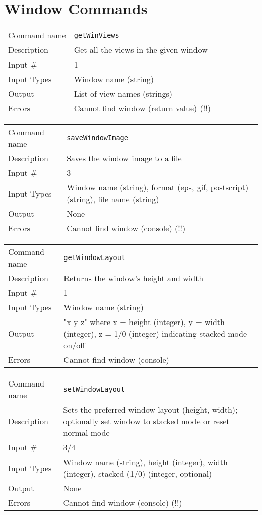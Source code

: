 \section{Window Commands}

\noindent
\begin{tabular}{l|p{5in}}
\hline
Command name & {\tt getWinViews} \\
Description  & Get all the views in the given window \\
Input \#     & 1 \\
Input Types  & Window name (string) \\
Output       & List of view names (strings) \\
Errors       & Cannot find window (return value) (!!) \\
\hline
\end{tabular}

\bigskip

\noindent
\begin{tabular}{l|p{5in}}
\hline
Command name & {\tt saveWindowImage} \\
Description  & Saves the window image to a file \\
Input \#     & 3 \\
Input Types  & Window name (string), format (eps, gif, postscript) (string),
               file name (string) \\
Output       & None \\
Errors       & Cannot find window (console) (!!) \\
\hline
\end{tabular}

\bigskip

\noindent
\begin{tabular}{l|p{5in}}
\hline
Command name & {\tt getWindowLayout} \\
Description  & Returns the window's height and width \\
Input \#     & 1 \\
Input Types  & Window name (string) \\
Output       & "x y z" where x = height (integer), y = width (integer),
               z = 1/0 (integer) indicating stacked mode on/off \\
Errors       & Cannot find window (console) \\
\hline
\end{tabular}

\bigskip

\noindent
\begin{tabular}{l|p{5in}}
\hline
Command name & {\tt setWindowLayout} \\
Description  & Sets the preferred window layout (height, width); optionally
               set window to stacked mode or reset normal mode \\
Input \#     & 3/4 \\
Input Types  & Window name (string), height (integer), width (integer),
               stacked (1/0) (integer, optional) \\
Output       & None \\
Errors       & Cannot find window (console) (!!) \\
\hline
\end{tabular}

